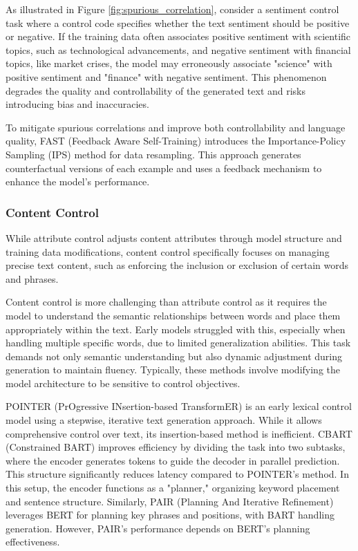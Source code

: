 \documentclass[acmsmall, screen]{acmart}
\begin{document}
As illustrated in Figure \ref{fig:spurious_correlation}, consider a sentiment control task where a control code specifies whether the text sentiment should be positive or negative. If the training data often associates positive sentiment with scientific topics, such as technological advancements, and negative sentiment with financial topics, like market crises, the model may erroneously associate "science" with positive sentiment and "finance" with negative sentiment. This phenomenon degrades the quality and controllability of the generated text and risks introducing bias and inaccuracies.

To mitigate spurious correlations and improve both controllability and language quality, FAST (Feedback Aware Self-Training) \cite{chai_arxiv22_fast} introduces the Importance-Policy Sampling (IPS) method for data resampling. This approach generates counterfactual versions of each example and uses a feedback mechanism to enhance the model's performance.

\subsubsection{\textbf{Content Control}} 
While attribute control adjusts content attributes through model structure and training data modifications, content control specifically focuses on managing precise text content, such as enforcing the inclusion or exclusion of certain words and phrases.

Content control is more challenging than attribute control as it requires the model to understand the semantic relationships between words and place them appropriately within the text. Early models struggled with this, especially when handling multiple specific words, due to limited generalization abilities. This task demands not only semantic understanding but also dynamic adjustment during generation to maintain fluency. Typically, these methods involve modifying the model architecture to be sensitive to control objectives.

POINTER (PrOgressive INsertion-based TransformER) \cite{zhang_emnlp20_POINTER} is an early lexical control model using a stepwise, iterative text generation approach. While it allows comprehensive control over text, its insertion-based method is inefficient.
CBART (Constrained BART) \cite{he_emnlp21_CBART} improves efficiency by dividing the task into two subtasks, where the encoder generates tokens to guide the decoder in parallel prediction. This structure significantly reduces latency compared to POINTER's method.
In this setup, the encoder functions as a "planner," organizing keyword placement and sentence structure. Similarly, PAIR (Planning And Iterative Refinement) \cite{hua_emnlp20_PAIR} leverages BERT for planning key phrases and positions, with BART handling generation. However, PAIR's performance depends on BERT's planning effectiveness.
\end{document}
